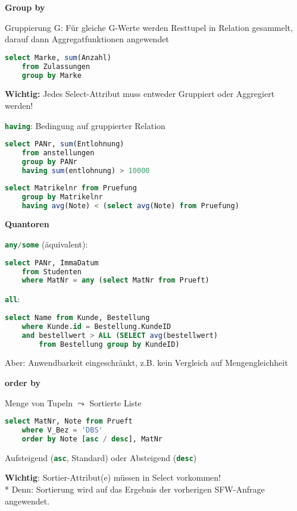 \textbf{Group by}
\begin{items}
	\item Gruppierung G: Für gleiche G-Werte werden Resttupel in Relation gesammelt, darauf dann Aggregatfunktionen angewendet
	\item
	\begin{lstlisting}[language=sql]
select Marke, sum(Anzahl)
	from Zulassungen
	group by Marke
	\end{lstlisting}
	\item \textbf{Wichtig:} Jedes Select-Attribut muss entweder Gruppiert oder Aggregiert werden!
	\item \lstinline[language=sql]{having}: Bedingung auf gruppierter Relation
	\begin{lstlisting}[language=sql]
select PANr, sum(Entlohnung)
	from anstellungen
	group by PANr
	having sum(entlohnung) > 10000
	\end{lstlisting}
	
	\item
	\begin{lstlisting}[language=sql]
select Matrikelnr from Pruefung
	group by Matrikelnr
	having avg(Note) < (select avg(Note) from Pruefung)
	\end{lstlisting}
\end{items}

\newpage

\textbf{Quantoren}
\begin{items}
	\item \lstinline[language=sql]{any/some} (äquivalent):
	\begin{lstlisting}[language=sql]
select PANr, ImmaDatum
	from Studenten
	where MatNr = any (select MatNr from Prueft)
	\end{lstlisting}
	\item \lstinline[language=sql]{all}:
	\begin{lstlisting}[language=sql]
select Name from Kunde, Bestellung
	where Kunde.id = Bestellung.KundeID
	and bestellwert > ALL (SELECT avg(bestellwert) 
		from Bestellung group by KundeID)
	\end{lstlisting}
	\item Aber: Anwendbarkeit eingeschränkt, z.B. kein Vergleich auf Mengengleichheit
\end{items}

\textbf{order by}
\begin{items}
	\item Menge von Tupeln $\leadsto$ Sortierte Liste
	\begin{lstlisting}[language=sql]
select MatNr, Note from Prueft
	where V_Bez = 'DBS'
	order by Note [asc / desc], MatNr
	\end{lstlisting}
	\item Aufsteigend (\lstinline[language=sql]{asc}, Standard) oder Absteigend (\lstinline[language=sql]{desc})
	\item \textbf{Wichtig}: Sortier-Attribut(e) müssen in Select vorkommen!\\*
	Denn: Sortierung wird auf das Ergebnis der vorherigen SFW-Anfrage angewendet.
\end{items}

